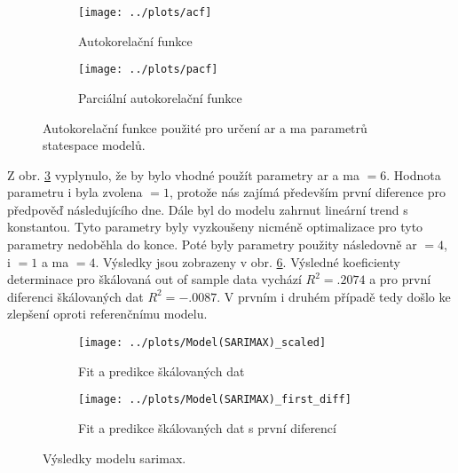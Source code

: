 \documentclass[a4paper,12pt, czech]{article}
\begin{document}
\begin{figure}[htb]
	\begin{subfigure}[t]{1\linewidth}
		\centering
		\texttt{[image: ../plots/acf]}
		\caption{Autokorelační funkce}
		\label{fig:acf}
	\end{subfigure}
	\begin{subfigure}[t]{1\linewidth}
		\centering
		\texttt{[image: ../plots/pacf]}
		\caption{Parciální autokorelační funkce}
		\label{fig:pacf}
	\end{subfigure}
	\caption{Autokorelační funkce použité pro určení \gls{ar} a \gls{ma} parametrů statespace modelů.}\label{fig:auto_func}
\end{figure}


Z obr. \ref{fig:auto_func} vyplynulo, že by bylo vhodné použít parametry \gls{ar} a \gls{ma} $= 6$.
Hodnota parametru \gls{i} byla zvolena $= 1$, protože nás zajímá především první diference pro předpověď následujícího dne.
Dále byl do modelu zahrnut lineární trend s konstantou.
Tyto parametry byly vyzkoušeny nicméně optimalizace pro tyto parametry nedoběhla do konce.
Poté byly parametry použity následovně \gls{ar} $= 4$, \gls{i} $= 1$ a \gls{ma} $= 4$.
Výsledky jsou zobrazeny v obr. \ref{fig:sarimax}.
Výsledné koeficienty determinace pro škálovaná out of sample data vychází $R^2=\num{.2074}$ a pro první diferenci škálovaných dat $R^2=\num{-.0087}$.
V prvním i druhém případě tedy došlo ke zlepšení oproti referenčnímu modelu.

\begin{figure}[htb]
	\begin{subfigure}[t]{.5\linewidth}
		\centering
		\texttt{[image: ../plots/Model(SARIMAX)\_scaled]}
		\caption{Fit a predikce škálovaných dat}
		\label{fig:sarimax_scaled}
	\end{subfigure}
	\begin{subfigure}[t]{.5\linewidth}
		\centering
		\texttt{[image: ../plots/Model(SARIMAX)\_first\_diff]}
		\caption{Fit a predikce škálovaných dat s první diferencí}
		\label{fig:sarimax_fd}
	\end{subfigure}
	\caption{Výsledky modelu \gls{sarimax}.}\label{fig:sarimax}
\end{figure}


\subsection{}
\end{document}

